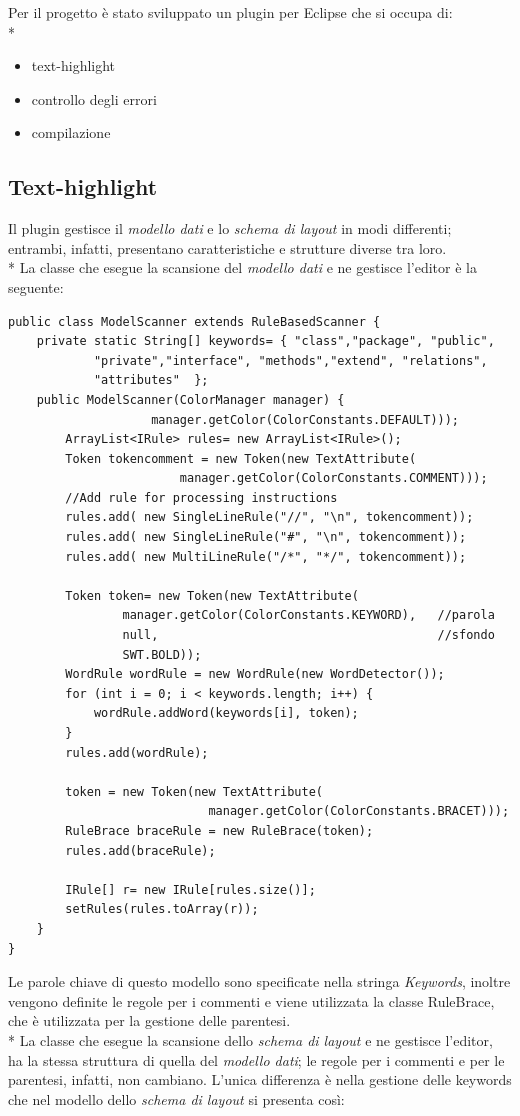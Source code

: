 Per il progetto è stato sviluppato un plugin per Eclipse che si occupa di: \\*
\begin{itemize}
  \item text-highlight
  \item controllo degli errori
  \item compilazione
\end{itemize} 


\subsection{Text-highlight}
Il plugin gestisce il \emph{modello dati} e lo \emph{schema di layout} in modi differenti; 
entrambi, infatti, presentano caratteristiche e strutture diverse tra loro. \\*
La classe che esegue la scansione del \emph{modello dati} e ne gestisce l'editor
è la seguente:

\begin{lstlisting}[caption={ModelScanner}, style={java}]
public class ModelScanner extends RuleBasedScanner {
	private static String[] keywords= { "class","package", "public",
			"private","interface", "methods","extend", "relations", 
			"attributes"  };
	public ModelScanner(ColorManager manager) {
					manager.getColor(ColorConstants.DEFAULT)));
		ArrayList<IRule> rules= new ArrayList<IRule>();	
		Token tokencomment = new Token(new TextAttribute(
						manager.getColor(ColorConstants.COMMENT)));
		//Add rule for processing instructions
		rules.add( new SingleLineRule("//", "\n", tokencomment));
		rules.add( new SingleLineRule("#", "\n", tokencomment));
		rules.add( new MultiLineRule("/*", "*/", tokencomment));
		
		Token token= new Token(new TextAttribute(
				manager.getColor(ColorConstants.KEYWORD), 	//parola
				null,                                       //sfondo
				SWT.BOLD));
		WordRule wordRule = new WordRule(new WordDetector());
		for (int i = 0; i < keywords.length; i++) {
			wordRule.addWord(keywords[i], token);
		}		
		rules.add(wordRule);
		
		token = new Token(new TextAttribute(
							manager.getColor(ColorConstants.BRACET)));
		RuleBrace braceRule = new RuleBrace(token);
		rules.add(braceRule);
		
		IRule[] r= new IRule[rules.size()];
		setRules(rules.toArray(r));
	}
}
\end{lstlisting}


Le parole chiave di questo modello sono specificate nella stringa
\emph{Keywords}, inoltre vengono definite le regole per i commenti e viene
utilizzata la classe RuleBrace, che è utilizzata per la gestione delle
parentesi.\\* 
La classe che esegue la scansione dello  \emph{schema di layout} e ne gestisce
l'editor, ha la stessa struttura di quella del \emph{modello dati}; le regole
per i commenti e per le parentesi, infatti, non cambiano. 
L'unica differenza è nella gestione delle keywords che nel modello dello
\emph{schema di layout} si presenta così:

